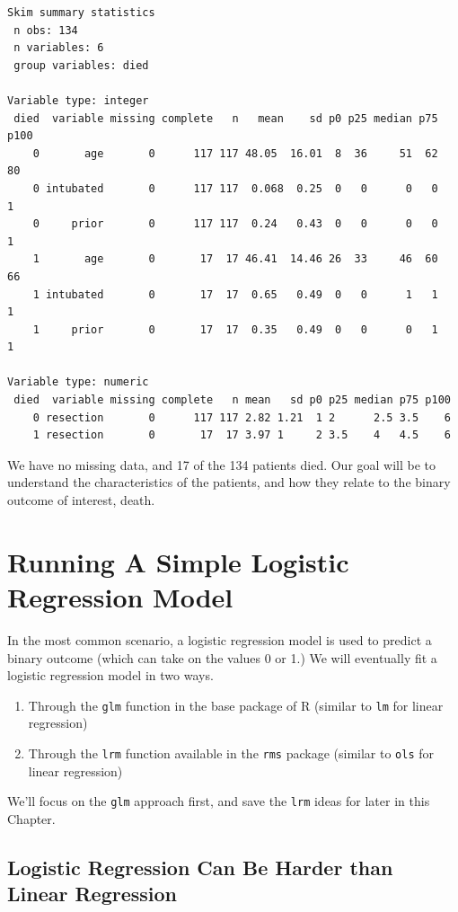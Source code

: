 \documentclass[]{book}
\providecommand{\tightlist}{%
  \setlength{\itemsep}{0pt}\setlength{\parskip}{0pt}}
\theoremstyle{definition}
\theoremstyle{definition}
\theoremstyle{definition}
\theoremstyle{remark}
\begin{document}
\begin{verbatim}
Skim summary statistics
 n obs: 134 
 n variables: 6 
 group variables: died 

Variable type: integer 
 died  variable missing complete   n   mean    sd p0 p25 median p75 p100
    0       age       0      117 117 48.05  16.01  8  36     51  62   80
    0 intubated       0      117 117  0.068  0.25  0   0      0   0    1
    0     prior       0      117 117  0.24   0.43  0   0      0   0    1
    1       age       0       17  17 46.41  14.46 26  33     46  60   66
    1 intubated       0       17  17  0.65   0.49  0   0      1   1    1
    1     prior       0       17  17  0.35   0.49  0   0      0   1    1

Variable type: numeric 
 died  variable missing complete   n mean   sd p0 p25 median p75 p100
    0 resection       0      117 117 2.82 1.21  1 2      2.5 3.5    6
    1 resection       0       17  17 3.97 1     2 3.5    4   4.5    6
\end{verbatim}

We have no missing data, and 17 of the 134 patients died. Our goal will
be to understand the characteristics of the patients, and how they
relate to the binary outcome of interest, death.

\section{Running A Simple Logistic Regression
Model}\label{running-a-simple-logistic-regression-model}

In the most common scenario, a logistic regression model is used to
predict a binary outcome (which can take on the values 0 or 1.) We will
eventually fit a logistic regression model in two ways.

\begin{enumerate}
\def\labelenumi{\arabic{enumi}.}
\tightlist
\item
  Through the \texttt{glm} function in the base package of R (similar to
  \texttt{lm} for linear regression)
\item
  Through the \texttt{lrm} function available in the \texttt{rms}
  package (similar to \texttt{ols} for linear regression)
\end{enumerate}

We'll focus on the \texttt{glm} approach first, and save the
\texttt{lrm} ideas for later in this Chapter.

\subsection{Logistic Regression Can Be Harder than Linear
Regression}\label{logistic-regression-can-be-harder-than-linear-regression}
\end{document}
